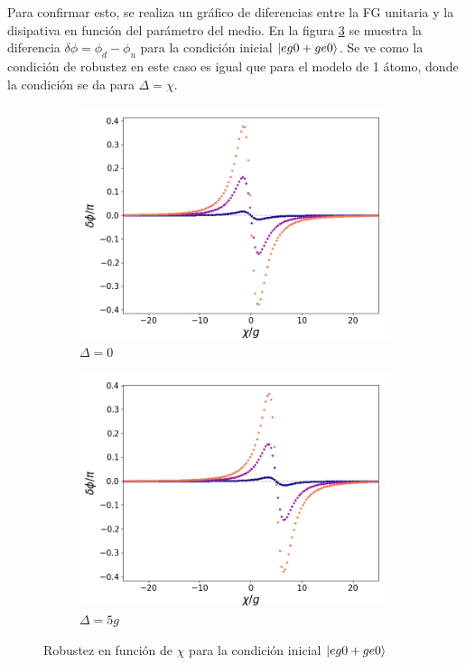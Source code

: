 Para confirmar esto, se realiza un gráfico de diferencias entre la FG unitaria y la disipativa en función del parámetro del medio. En la figura \ref{fig5:robustez kerr eg0} se muestra la diferencia $\delta\phi=\phi_d-\phi_u$ para la condición inicial $\ket{eg0+ge0}$. Se ve como la condición de robustez en este caso es igual que para el modelo de 1 átomo, donde la condición se da para $\Delta=\chi$. 

\begin{figure}[h]
    \centering
    \begin{subfigure}{0.49\textwidth}
        \includegraphics[width=\textwidth]{figuras/ch5/robustez/chi/eg0+ge0 d=0.0g k=0.0g J=0.0g.png}
        \caption{$\Delta=0$}
        \label{fig5:robustez kerr 1 eg0}
    \end{subfigure}
    \hfill
    \begin{subfigure}{0.49\textwidth}
        \includegraphics[width=\textwidth]{figuras/ch5/robustez/chi/eg0+ge0 d=5.0g k=0.0g J=0.0g.png}
        \caption{$\Delta=5g$}
        \label{fig5:robustez kerr 2 eg0}
    \end{subfigure}
    \caption{Robustez en función de $\chi$ para la condición inicial $\ket{eg0+ge0}$}
    \label{fig5:robustez kerr eg0}
\end{figure}

